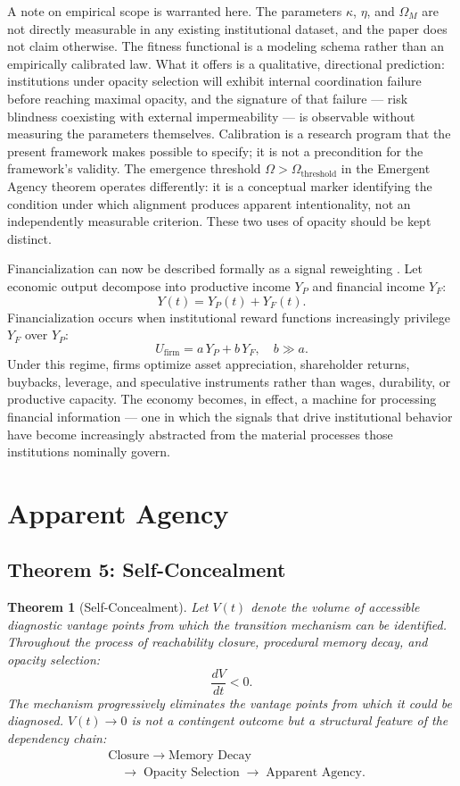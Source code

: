 \documentclass[12pt, a4paper]{article}
\theoremstyle{named}
\newtheorem{theorem}{Theorem}
\newenvironment{boxedtheorem}[1]{%
  \begin{thmbox}\begin{theorem}[#1]%
}{%
  \end{theorem}\end{thmbox}%
}
\begin{document}
A note on empirical scope is warranted here. The parameters $\kappa$,
$\eta$, and $\Omega_M$ are not directly measurable in any existing
institutional dataset, and the paper does not claim otherwise. The
fitness functional is a modeling schema rather than an empirically
calibrated law. What it offers is a qualitative, directional prediction:
institutions under opacity selection will exhibit internal coordination
failure before reaching maximal opacity, and the signature of that
failure — risk blindness coexisting with external impermeability — is
observable without measuring the parameters themselves. Calibration is a
research program that the present framework makes possible to specify;
it is not a precondition for the framework's validity. The emergence
threshold $\Omega > \Omega_{\text{threshold}}$ in the Emergent Agency
theorem operates differently: it is a conceptual marker identifying the
condition under which alignment produces apparent intentionality, not an
independently measurable criterion. These two uses of opacity should be
kept distinct.

Financialization can now be described formally as a signal reweighting
\cite{krippner2011,dumenil2004}. Let economic output decompose into
productive income $Y_P$ and financial income $Y_F$:
\[
  Y(t) = Y_P(t) + Y_F(t).
\]
Financialization occurs when institutional reward functions increasingly
privilege $Y_F$ over $Y_P$:
\[
  U_{\text{firm}} = a\,Y_P + b\,Y_F, \quad b \gg a.
\]
Under this regime, firms optimize asset appreciation, shareholder
returns, buybacks, leverage, and speculative instruments rather than
wages, durability, or productive capacity. The economy becomes, in
effect, a machine for processing financial information — one in which
the signals that drive institutional behavior have become increasingly
abstracted from the material processes those institutions nominally
govern.

\section{Apparent Agency}

\subsection{Theorem 5: Self-Concealment}

\begin{boxedtheorem}{Self-Concealment}
Let $V(t)$ denote the volume of accessible diagnostic vantage points
from which the transition mechanism can be identified. Throughout the
process of reachability closure, procedural memory decay, and opacity
selection:
\[
  \frac{dV}{dt} < 0.
\]
The mechanism progressively eliminates the vantage points from which
it could be diagnosed. $V(t) \to 0$ is not a contingent outcome but a
structural feature of the dependency chain:
\[
\begin{aligned}
  &\text{Closure}
  \;\to\; \text{Memory Decay} \\
  &\quad\to\; \text{Opacity Selection}
  \;\to\; \text{Apparent Agency.}
\end{aligned}
\]
\end{boxedtheorem}
\end{document}
